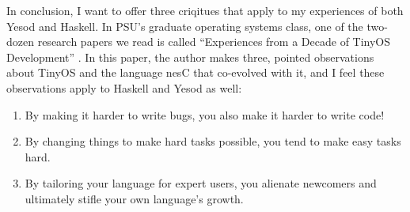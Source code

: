 In conclusion, I want to offer three criqitues that apply to my experiences of both Yesod and Haskell. In PSU's graduate operating systems class, one of the two-dozen research papers we read is called ``Experiences from a Decade of TinyOS Development'' \cite{tinyOS}. In this paper, the author makes three, pointed observations about TinyOS and the language nesC that co-evolved with it, and I feel these observations apply to Haskell and Yesod as well:

\begin{enumerate}
  \item By making it harder to write bugs, you also make it harder to write code!
  \item By changing things to make hard tasks possible, you tend to make easy tasks hard.
  \item By tailoring your language for expert users, you alienate newcomers and ultimately stifle your own language's growth.
\end{enumerate}
